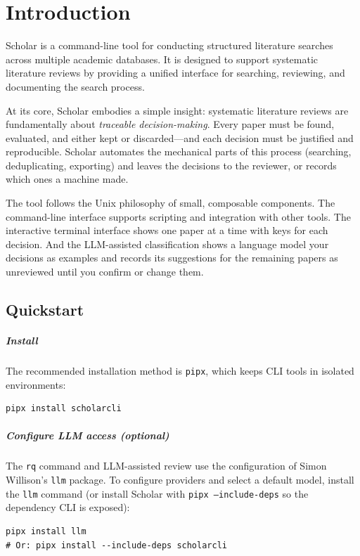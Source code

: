 \chapter{Introduction}
\label{ch:introduction}

Scholar is a command-line tool for conducting structured literature searches
across multiple academic databases.
It is designed to support systematic literature reviews by providing a unified
interface for searching, reviewing, and documenting the search process.

At its core, Scholar embodies a simple insight: systematic literature reviews
are fundamentally about \emph{traceable decision-making}.
Every paper must be found, evaluated, and either kept or discarded---and each
decision must be justified and reproducible.
Scholar automates the mechanical parts of this process (searching,
deduplicating, exporting) and leaves the decisions to the reviewer, or
records which ones a machine made.

The tool follows the Unix philosophy of small, composable components.
The command-line interface supports scripting and integration with other tools.
The interactive terminal interface shows one paper at a time with
keys for each decision.
And the LLM-assisted classification shows a language model your
decisions as examples and records its suggestions for the remaining
papers as unreviewed until you confirm or change them.


\section{Quickstart}

\paragraph{Install}
The recommended installation method is \texttt{pipx}, which keeps CLI
tools in isolated environments:
\begin{verbatim}
pipx install scholarcli
\end{verbatim}

\paragraph{Configure LLM access (optional)}
The \texttt{rq} command and LLM-assisted review use the configuration
of Simon Willison's \texttt{llm} package.
To configure providers and select a default model, install the \texttt{llm}
command (or install Scholar with \texttt{pipx --include-deps} so the
dependency CLI is exposed):
\begin{verbatim}
pipx install llm
# Or: pipx install --include-deps scholarcli
\end{verbatim}


